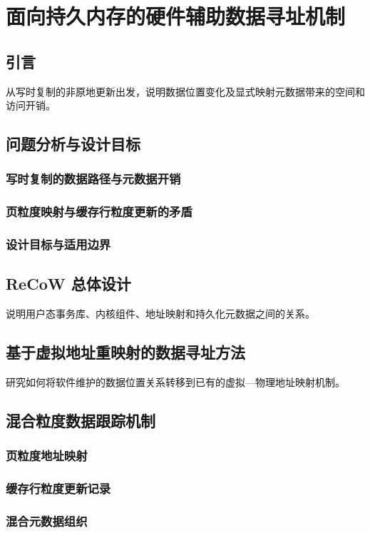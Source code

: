 \chapter{面向持久内存的硬件辅助数据寻址机制}

\section{引言}
从写时复制的非原地更新出发，说明数据位置变化及显式映射元数据带来的空间和访问开销。
\section{问题分析与设计目标}
\subsection{写时复制的数据路径与元数据开销}
\subsection{页粒度映射与缓存行粒度更新的矛盾}
\subsection{设计目标与适用边界}

\section{ReCoW 总体设计}
说明用户态事务库、内核组件、地址映射和持久化元数据之间的关系。
\section{基于虚拟地址重映射的数据寻址方法}
研究如何将软件维护的数据位置关系转移到已有的虚拟—物理地址映射机制。
\section{混合粒度数据跟踪机制}
\subsection{页粒度地址映射}
\subsection{缓存行粒度更新记录}
\subsection{混合元数据组织}

